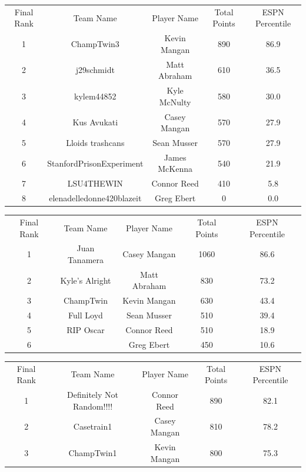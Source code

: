 \documentclass[11pt,letterpaper]{article}
\begin{document}
\newpage
{}
\vspace{-25pt}
\begin{table} [h]
\begin{center}
\begin{tabular} { c c c c c }
\\ Final Rank & Team Name & Player Name & Total Points & ESPN Percentile
\\ 1  & ChampTwin3 & Kevin Mangan & 890 & 86.9
\\ 2 & j29schmidt & Matt Abraham & 610 & 36.5
\\ 3 & kylem44852 & Kyle McNulty & 580 & 30.0
\\ 4 & Kus Avukati & Casey Mangan & 570 & 27.9
\\ 5 & Lloids trashcans & Sean Musser & 570 & 27.9
\\ 6 & StanfordPrisonExperiment & James McKenna & 540 & 21.9
\\ 7 & LSU4THEWIN & Connor Reed & 410 & 5.8
\\ 8 & elenadelledonne420blazeit & Greg Ebert & 0 & 0.0
\end{tabular}
\end{center}
\end{table}

\vspace{-25pt}
\begin{table} [h]
\begin{center}
\begin{tabular} { c c c c c }
\\ Final Rank & Team Name & Player Name & Total Points & ESPN Percentile
\\ 1  & Juan Tanamera & Casey Mangan & 1060 & 86.6
\\ 2 & Kyle's Alright & Matt Abraham & 830 & 73.2
\\ 3 & ChampTwin & Kevin Mangan & 630 & 43.4
\\ 4 & Full Loyd & Sean Musser & 510 & 39.4
\\ 5 & RIP Oscar & Connor Reed & 510 & 18.9
\\ 6 &  & Greg Ebert & 450 & 10.6
\end{tabular}
\end{center}
\end{table}

\vspace{-25pt}
\begin{table} [h]
\begin{center}
\begin{tabular} { c c c c c }
\\ Final Rank & Team Name & Player Name & Total Points & ESPN Percentile
\\ 1 & Definitely Not Random!!!! & Connor Reed & 890 & 82.1
\\ 2 & Casetrain1 & Casey Mangan & 810 & 78.2
\\ 3 & ChampTwin1 & Kevin Mangan & 800 & 75.3
\end{tabular}
\end{center}
\end{table}
\end{document}
